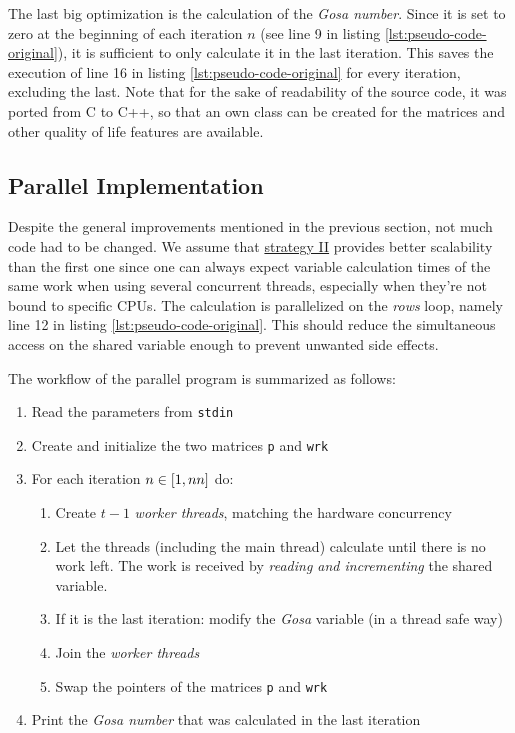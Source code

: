 The last big optimization is the calculation of the \textit{Gosa number}. Since it is set to zero at the beginning of each iteration $n$ (see line 9 in listing \ref{lst:pseudo-code-original}), it is sufficient to only calculate it in the last iteration. This saves the execution of line 16 in listing \ref{lst:pseudo-code-original} for every iteration, excluding the last. Note that for the sake of readability of the source code, it was ported from C to C++, so that an own class can be created for the matrices and other quality of life features are available.

\subsection{Parallel Implementation}
\label{ssec:parallel_implementation}

Despite the general improvements mentioned in the previous section, not much code had to be changed. We assume that \hyperref[ssec:strategy-ii]{strategy II} provides better scalability than the first one since one can always expect variable calculation times of the same work when using several concurrent threads, especially when they're not bound to specific CPUs. The calculation is parallelized on the \textit{rows} loop, namely line 12 in listing \ref{lst:pseudo-code-original}. This should reduce the simultaneous access on the shared variable enough to prevent unwanted side effects.

The workflow of the parallel program is summarized as follows:
\begin{enumerate}
    \item Read the parameters from \verb+stdin+
    \item Create and initialize the two matrices \verb+p+ and \verb+wrk+
    \item For each iteration $n \in \interval{1}{nn}$ do:
    \begin{enumerate}
        \item Create $t-1$ \textit{worker threads}, matching the hardware concurrency
        \item Let the threads (including the main thread) calculate until there is no work left. The work is received by \textit{reading and incrementing} the shared variable.
        \item If it is the last iteration: modify the \textit{Gosa} variable (in a thread safe way)
        \item Join the \textit{worker threads}
        \item Swap the pointers of the matrices \verb+p+ and \verb+wrk+
    \end{enumerate}
    \item Print the \textit{Gosa number} that was calculated in the last iteration
\end{enumerate}

